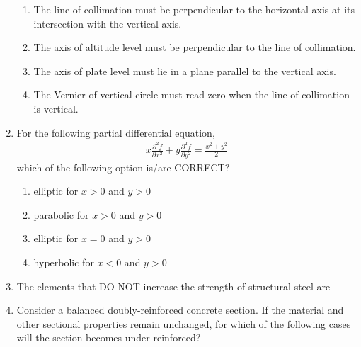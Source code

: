 \documentclass[journal,12pt,onecolumn]{article}
\theoremstyle{remark}
\begin{document}
\begin{enumerate}
    \hfill{}
    \begin{enumerate}
        \item The line of collimation must be perpendicular to the horizontal axis at its intersection with the vertical axis.
        \item The axis of altitude level must be perpendicular to the line of collimation.
        \item The axis of plate level must lie in a plane parallel to the vertical axis.
        \item The Vernier of vertical circle must read zero when the line of collimation is vertical.
    \end{enumerate}

    \item For the following partial differential equation,
    \begin{align}
    x \frac{\partial^2 f}{\partial x^2} + y \frac{\partial^2 f}{\partial y^2} = \frac{x^2 + y^2}{2}
    \end{align}
    which of the following option is/are CORRECT?
    
    \hfill{}
    \begin{enumerate}
        \item elliptic for $x > 0$ and $y > 0$
        \item parabolic for $x > 0$ and $y > 0$
        \item elliptic for $x = 0$ and $y > 0$
        \item hyperbolic for $x < 0$ and $y > 0$
    \end{enumerate}

    \item The elements that DO NOT increase the strength of structural steel are
    
    \hfill{}
    \begin{enumerate}
    \end{enumerate}

    \item Consider a balanced doubly-reinforced concrete section. If the material and other sectional properties remain unchanged, for which of the following cases will the section becomes under-reinforced?
    

\end{enumerate}
\end{document}
